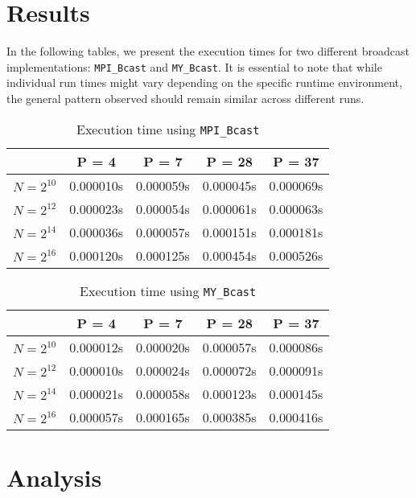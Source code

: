 \documentclass[12pt,a4paper]{article}
\begin{document}
  
  
\section{Results}

In the following tables, 
we present the execution times for two different broadcast implementations: 
\texttt{MPI\_Bcast} and \texttt{MY\_Bcast}. 
It is essential to note that while individual run times might vary depending on the specific runtime environment, 
the general pattern observed should remain similar across different runs.

\begin{table}[!htb]
    \centering
    \begin{tabular}{|c|c|c|c|c|}
    \hline
    & P = 4 & P = 7 & P = 28 & P = 37 \\
    \hline
    $N = 2^{10}$ & 0.000010s & 0.000059s & 0.000045s & 0.000069s \\
    \hline
    $N = 2^{12}$ & 0.000023s & 0.000054s & 0.000061s & 0.000063s \\
    \hline
    $N = 2^{14}$ & 0.000036s & 0.000057s & 0.000151s & 0.000181s \\
    \hline
    $N = 2^{16}$ & 0.000120s & 0.000125s & 0.000454s & 0.000526s \\
    \hline
    \end{tabular}
    \caption{Execution time using \texttt{MPI\_Bcast}}
    \end{table}

\begin{table}[!htb]
    \centering
    \begin{tabular}{|c|c|c|c|c|}
    \hline
    & P = 4 & P = 7 & P = 28 & P = 37 \\
    \hline
    $N = 2^{10}$ & 0.000012s & 0.000020s & 0.000057s & 0.000086s \\
    \hline
    $N = 2^{12}$ & 0.000010s & 0.000024s & 0.000072s & 0.000091s \\
    \hline
    $N = 2^{14}$ & 0.000021s & 0.000058s & 0.000123s & 0.000145s \\
    \hline
    $N = 2^{16}$ & 0.000057s & 0.000165s & 0.000385s & 0.000416s \\
    \hline
    \end{tabular}
    \caption{Execution time using \texttt{MY\_Bcast}}
    \end{table}

\section{Analysis}
\end{document}

